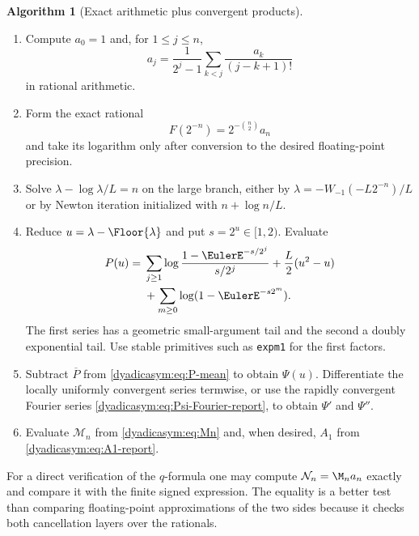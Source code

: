 \documentclass[11pt,oneside]{article}
\theoremstyle{definition}
\newtheorem{algorithm}[algorithm]{Algorithm}
\theoremstyle{remark}
\begin{document}
\begin{algorithm}[Exact arithmetic plus convergent products]
\label{dyadicasym:alg:numerics}
\leavevmode
\begin{enumerate}
\item Compute $a_0=1$ and, for $1\le j\le n$,
\begin{equation*}
 a_j=\frac1{2^j-1}\sum_{k<j}\frac{a_k}{(j-k+1)!}
\end{equation*}
in rational arithmetic.

\item Form the exact rational
\begin{equation*}
 F(2^{-n})=2^{-\binom n2}a_n
\end{equation*}
and take its logarithm only after conversion to the desired floating-point precision.

\item Solve $\lambda-\log\lambda/L=n$ on the large branch, either by
$\lambda=-W_{-1}(-L2^{-n})/L$ or by Newton iteration initialized with
$n+\log n/L$.

\item Reduce $u=\lambda-\Floor{\lambda}$ and put $s=2^u\in[1,2)$.  Evaluate
\begin{align*}
 P(u)={}&\sum_{j\ge1}\log\frac{1-\EulerE^{-s/2^j}}{s/2^j}
 +\frac L2(u^2-u)\\
 &+\sum_{m\ge0}\log(1-\EulerE^{-s2^m}).
\end{align*}
The first series has a geometric small-argument tail and the second a doubly exponential tail.
Use stable primitives such as \texttt{expm1} for the first factors.

\item Subtract $\overline P$ from \eqref{dyadicasym:eq:P-mean} to obtain $\Psi(u)$.  Differentiate the
locally uniformly convergent series termwise, or use the rapidly convergent Fourier series
\eqref{dyadicasym:eq:Psi-Fourier-report}, to obtain $\Psi'$ and $\Psi''$.

\item Evaluate $\mathcal M_n$ from \eqref{dyadicasym:eq:Mn} and, when desired, $A_1$ from
\eqref{dyadicasym:eq:A1-report}.
\end{enumerate}
\end{algorithm}

For a direct verification of the $q$-formula one may compute
$\mathcal N_n=\M_na_n$ exactly and compare it with the finite signed expression.  The equality
is a better test than comparing floating-point approximations of the two sides because it
checks both cancellation layers over the rationals.
\end{document}
